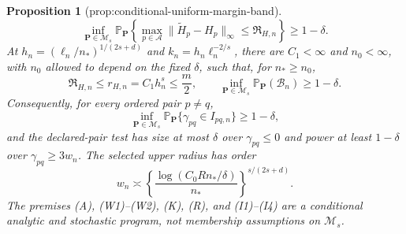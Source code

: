\documentclass{article}
\newtheorem{proposition}{Proposition}
\begin{document}
\begin{proposition}[prop:conditional-uniform-margin-band]
\[
 \inf_{\mathbf P\in\mathcal M_s}
 \mathbb P_{\mathbf P}\!\left\{
 \max_{p\in\mathcal A}\lVert\widetilde H_p-H_p\rVert_\infty
 \le\mathfrak R_{H,n}\right\}\ge1-\delta.
 \tag{B1}
\]
At \(h_n=(\ell_n/n_\ast)^{1/(2s+d)}\) and \(k_n=h_n\ell_n^{-2/s}\), there are \(C_1<\infty\) and \(n_0<\infty\), with \(n_0\) allowed to depend on the fixed \(\delta\), such that, for \(n_\ast\ge n_0\),
\[
 \mathfrak R_{H,n}\le r_{H,n}=C_1h_n^s\le\frac m2,
 \qquad
 \inf_{\mathbf P\in\mathcal M_s}\mathbb P_{\mathbf P}(\mathcal B_n)\ge1-\delta.
 \tag{B2}
\]
Consequently, for every ordered pair \(p\ne q\),
\[
 \inf_{\mathbf P\in\mathcal M_s}
 \mathbb P_{\mathbf P}\{\gamma_{pq}\in I_{pq,n}\}\ge1-\delta,
\]
and the declared-pair test has size at most \(\delta\) over \(\gamma_{pq}\le0\) and power at least \(1-\delta\) over \(\gamma_{pq}\ge3w_n\).  The selected upper radius has order
\[
 w_n\asymp
 \left\{\frac{\log(C_0Rn_\ast/\delta)}{n_\ast}\right\}^{s/(2s+d)}.
\]
The premises (A), (W1)--(W2), (K), (R), and (I1)--(I4) are a conditional analytic and stochastic program, not membership assumptions on \(\mathcal M_s\).
\end{proposition}
\end{document}
